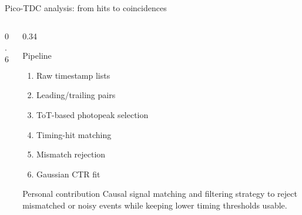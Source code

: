 \begin{frame}{Pico-TDC analysis: from hits to coincidences}
\small
\begin{columns}[T,totalwidth=\textwidth]
\begin{column}{0.6\textwidth}
\centering
{}
\vspace{0.2em}
\end{column}

\begin{column}{0.34\textwidth}
\begin{block}{Pipeline}
\begin{enumerate}
    \item Raw timestamp lists
    \item Leading/trailing pairs
    \item ToT-based photopeak selection
    \item Timing-hit matching
    \item Mismatch rejection
    \item Gaussian CTR fit
\end{enumerate}
\end{block}

\begin{alertblock}{Personal contribution}
Causal signal matching and filtering strategy to reject mismatched or noisy events while keeping lower timing thresholds usable.
\end{alertblock}
\end{column}
\end{columns}
\end{frame}
